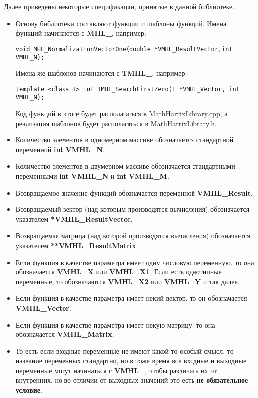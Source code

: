 \documentclass[a4paper,12pt]{article}
\begin{document}
Далее приведены некоторые спецификации, принятые в данной библиотеке.
\begin{itemize}
\item Основу библиотеки составляют функции и шаблоны функций. Имена функций начинаются с \textbf{MHL\_}, например:
\begin{lstlisting}[label=examplename,caption=Пример названия функции]
void MHL_NormalizationVectorOne(double *VMHL_ResultVector,int VMHL_N);
\end{lstlisting}
Имена же шаблонов начинаются с \textbf{TMHL\_}, например:
\begin{lstlisting}[label=examplename2,caption=Пример названия шаблона функции]
template <class T> int TMHL_SearchFirstZero(T *VMHL_Vector, int VMHL_N);
\end{lstlisting}
Код функций в итоге будет располагаться в MathHarrixLibrary.cpp, а реализация шаблонов будет располагаться в MathHarrixLibrary.h.
\item  Количество элементов в одномерном массиве обозначается стандартной переменной  \textbf{int VMHL\_N}.
\item Количество элементов в двумерном массиве обозначается стандартными переменными  \textbf{int VMHL\_N} и \textbf{int VMHL\_M}.
\item Возвращаемое значение функций обозначается переменной \textbf{VMHL\_Result}.
\item Возвращаемый вектор (над которым производятся вычисления) обозначается указателем \textbf{*VMHL\_ResultVector}.
\item Возвращаемая матрица (над которой производятся вычисления) обозначается указателем \textbf{**VMHL\_ResultMatrix}.
\item Если функция в качестве параметра имеет одну числовую переменную, то она обозначается \textbf{VMHL\_X} или \textbf{VMHL\_X1}. Если есть однотипные переменные, то обозначаются \textbf{VMHL\_X2} или \textbf{VMHL\_Y} и так далее.
\item Если функция в качестве параметра имеет некий вектор, то он обозначается \textbf{VMHL\_Vector}.
\item Если функция в качестве параметра имеет некую матрицу, то она обозначается \textbf{VMHL\_Matrix}.
\item То есть если входные переменные не имеют какой-то особый смысл, то название переменных стандартно, но в тоже время все входные и выходные переменные могут начинаться с \textbf{VMHL\_}, чтобы различать их от внутренних, но во отличии от выходных значений это есть \textbf{не обязательное условие}.
\end{itemize}
\end{document}
